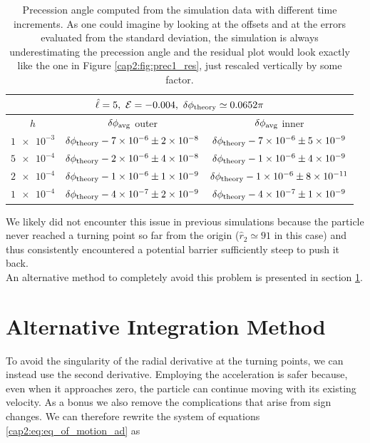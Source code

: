 \begin{table}[h]
    \centering
    \begin{tabular}{|c|c|c|}
        \hline
        \multicolumn{3}{|c|}{$\hat \ell = 5, ~ \mathcal E = -0.004,
        ~ \delta \phi_{\rm theory} \simeq 0.0652 \pi$} \\
        \hline
        $h$ & $\delta \phi_{\rm avg}$ outer & $\delta \phi_{\rm avg}$ inner \\
        \hline
        $\num{1e-3}$ & $\delta \phi_{\rm theory} - \num{7e-6} \pm \num{2e-8}$
        & $\delta \phi_{\rm theory} - \num{7e-6} \pm \num{5e-9}$ \\
        \hline
        $\num{5e-4}$ & $\delta \phi_{\rm theory} - \num{2e-6} \pm \num{4e-8}$
        & $\delta \phi_{\rm theory} - \num{1e-6} \pm \num{4e-9}$ \\
        \hline
        $\num{2e-4}$ & $\delta \phi_{\rm theory} - \num{1e-6} \pm \num{1e-9}$
        & $\delta \phi_{\rm theory} - \num{1e-6} \pm \num{8e-11}$ \\
        \hline
        $\num{1e-4}$ & $\delta \phi_{\rm theory} - \num{4e-7} \pm \num{2e-9}$
        & $\delta \phi_{\rm theory} - \num{4e-7} \pm \num{1e-9}$ \\
        \hline
    \end{tabular}
    \caption{Precession angle computed from the simulation data with different
    time increments.
    As one could imagine by looking at the offsets and at the errors evaluated
    from the standard deviation, the simulation is always underestimating the
    precession angle and the residual plot would look exactly like the one in
    Figure \ref{cap2:fig:prec1_res}, just rescaled vertically by some factor.}
    \label{cap2:tab:prec1}
\end{table}

We likely did not encounter this issue in previous simulations because the
particle never reached a turning point so far from the origin
($\hat r_2 \simeq 91$ in this case) and thus consistently encountered a
potential barrier sufficiently steep to push it back. \\
An alternative method to completely avoid this problem is presented in section
\ref{cap2:sec:alt_method}.


\section{Alternative Integration Method}
\label{cap2:sec:alt_method}

To avoid the singularity of the radial derivative at the turning points, we can
instead use the second derivative. Employing the acceleration is safer because,
even when it approaches zero, the particle can continue moving with its existing
velocity.
As a bonus we also remove the complications that arise from sign changes.
We can therefore rewrite the system of equations \ref{cap2:eq:eq_of_motion_ad}
as

